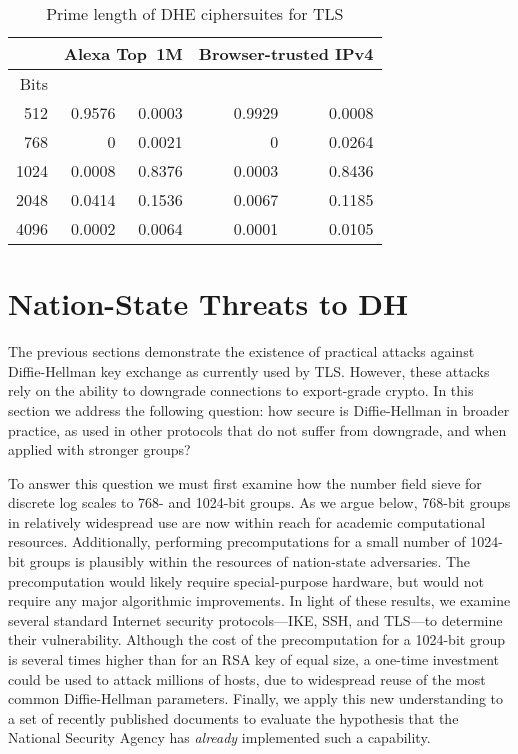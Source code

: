 \begin{table}[t]
\centering\small
\begin{tabular}{rrrrr}
& \multicolumn{2}{c}{Alexa Top~1M} & \multicolumn{2}{c}{Browser-trusted IPv4} \\
\toprule
Bits & \dheexp{} & \dhe{} & \dheexp{} & \dhe{} \\
\midrule
512  & 0.9576 & 0.0003 & 0.9929 & 0.0008 \\
768  &      0 & 0.0021 &      0 & 0.0264 \\
1024 & 0.0008 & 0.8376 & 0.0003 & 0.8436 \\
2048 & 0.0414 & 0.1536 & 0.0067 & 0.1185 \\
4096 & 0.0002 & 0.0064 & 0.0001 & 0.0105 \\
\bottomrule
\end{tabular}
\caption{Prime length of DHE ciphersuites for TLS
}
\label{tab:prime-length}
\end{table}
\fi


\section{Nation-State Threats to DH}

The previous sections demonstrate the existence of practical attacks against
Diffie-Hellman key exchange as currently used by TLS\@. However, these attacks
rely on the ability to downgrade connections to export-grade crypto.  In this section we address the following question:
how secure is Diffie-Hellman in broader practice, as used in other protocols
that do not suffer from downgrade, and when applied with stronger groups?



To answer this question we must first examine how the number field sieve for
discrete log scales to 768- and 1024-bit groups. As we argue below, 768-bit
groups  in relatively widespread use are now within reach for
academic computational resources. Additionally, performing precomputations for a small
number of 1024-bit groups is plausibly within the resources of nation-state adversaries. The precomputation would likely require special-purpose hardware, but
would not require any major algorithmic improvements. In light of these results, we examine several standard Internet
security protocols---IKE, SSH, and TLS---to determine their vulnerability.  Although the cost of
the precomputation for a 1024-bit group is several times higher than
for an RSA key of equal size, a one-time investment
could be used to attack millions of hosts, due to widespread reuse of
the most common Diffie-Hellman parameters. Finally, we apply this new understanding to a set of
recently published documents to evaluate the hypothesis that the
National Security Agency has {\em already} implemented such a
capability.

